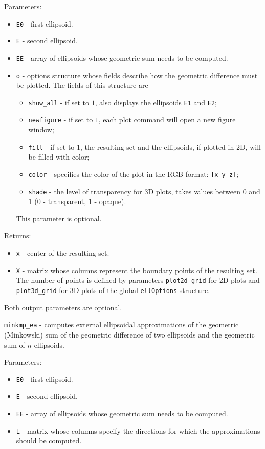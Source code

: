 \documentclass{report}
\begin{document}
Parameters:
\begin{itemize}
\item {\tt E0} - first ellipsoid.
\item {\tt E} - second ellipsoid.
\item {\tt EE} - array of ellipsoids whose geometric sum needs to be computed.
\item {\tt o} - options structure whose fields describe how the geometric
difference must be plotted. The fields of this structure are
\begin{itemize}
\item {\tt show\_all} - if set to $1$, also displays the ellipsoids
{\tt E1} and {\tt E2};
\item {\tt newfigure} - if set to $1$, each plot command will open a new
figure window;
\item {\tt fill} - if set to $1$, the resulting set and the ellipsoids,
if plotted in 2D, will be filled with color;
\item {\tt color} - specifies the color of the plot in the RGB format:
{\tt [x y z]};
\item {\tt shade} - the level of transparency for 3D plots, takes values
between $0$ and $1$ ($0$ - transparent, $1$ - opaque).
\end{itemize}
This parameter is optional.
\end{itemize}

Returns:
\begin{itemize}
\item {\tt x} - center of the resulting set.
\item {\tt X} - matrix whose columns represent the boundary points of the
resulting set. The number of points is defined by parameters
{\tt plot2d\_grid} for 2D plots and {\tt plot3d\_grid} for 3D plots of the
global {\tt ellOptions} structure.
\end{itemize}
Both output parameters are optional.

\newpage

{\Large {\tt minkmp\_ea}} - computes external ellipsoidal approximations
of the geometric (Minkowski) sum of the geometric difference of two ellipsoids
and the geometric sum of $n$ ellipsoids.

Parameters:
\begin{itemize}
\item {\tt E0} - first ellipsoid.
\item {\tt E} - second ellipsoid.
\item {\tt EE} - array of ellipsoids whose geometric sum needs to be computed.
\item {\tt L} - matrix whose columns specify the directions for which
the approximations should be computed.
\end{itemize}
\end{document}
